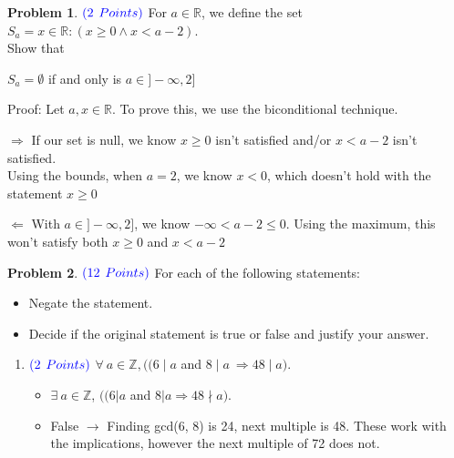 \documentclass[letterpaper, 12pt]{article}
\theoremstyle{definition}
\newtheorem{pb}{Problem} %
\begin{document}
\begin{spacing}{1.33}
\vspace{5mm}
\begin{pb}
    $\color{blue}{(2}$ $\color{blue}{Points)}$ For $a \in \mathbb{R}$, we define the set $S_a = {x \in \mathbb{R} : (x \geq 0 \wedge x < a - 2)}$.\\
    Show that
    
        {\centering $S_a = \emptyset$ if and only is $a \in ] - \infty, 2]$ \par}
    
    Proof: Let $a, x \in \mathbb{R}$. To prove this, we use the biconditional technique.\\

    {\centering $\Longrightarrow$ If our set is null, we know $x \geq 0$ isn't satisfied and/or $x < a - 2$ isn't satisfied. \\ Using the bounds, when $a = 2$, we know $x < 0$, which doesn't hold with the statement $x \geq 0$ \par}
    {\centering $\Longleftarrow$ With $a \in ] - \infty, 2]$, we know $-\infty < a-2 \leq 0$. Using the maximum, this won't satisfy both $x \geq 0$ and $x < a-2$  \par}

    
\end{pb}






\vspace{5mm}
\setcounter{pb}{3}
\begin{pb}
    $\color{blue}{(12}$ $\color{blue}{Points)}$ For each of the following statements:
    \begin{itemize}
        \item Negate the statement.
        \item Decide if the original statement is true or false and justify your answer.
    \end{itemize}
    \begin{enumerate}
        \item[1.] $\color{blue}{(2}$ $\color{blue}{Points)}$  $\forall \: a \in \mathbb{Z}, ((6\mid a$ and $8\mid a \: \Longrightarrow 48 \mid a).$
        \begin{itemize}
            \item $\exists \: a \in \mathbb{Z}$, $((6 | a$ and $8 | a \Longrightarrow 48 \nmid a)$.
            \item False $\longrightarrow$ Finding gcd(6, 8) is 24, next multiple is 48. These work with the implications, however the next multiple of 72 does not.  
        \end{itemize}
        

\end{enumerate}
\end{pb}
\end{spacing}
\end{document}
